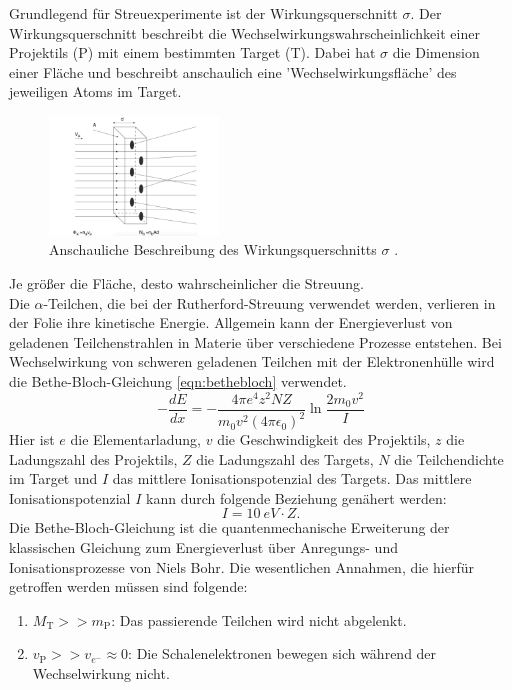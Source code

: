 Grundlegend für Streuexperimente ist der Wirkungsquerschnitt $\sigma$.
Der Wirkungsquerschnitt beschreibt die Wechselwirkungswahrscheinlichkeit einer Projektils (P) mit einem bestimmten Target (T).
Dabei hat $\sigma$ die Dimension einer Fläche und beschreibt anschaulich eine 'Wechselwirkungsfläche' des jeweiligen Atoms im Target.
\begin{figure}[h!]
  \centering
  \includegraphics[width=0.4\textwidth]{images/wq.pdf}
  \caption{Anschauliche Beschreibung des Wirkungsquerschnitts $\sigma$ \cite{povh}.}
  \label{fig:wq}
\end{figure}
Je größer die Fläche, desto wahrscheinlicher die Streuung.
%
\\Die $\alpha$-Teilchen, die bei der Rutherford-Streuung verwendet werden, verlieren in der Folie ihre kinetische Energie.
Allgemein kann der Energieverlust von geladenen Teilchenstrahlen in Materie über verschiedene Prozesse entstehen.
Bei Wechselwirkung von schweren geladenen Teilchen mit der Elektronenhülle wird die Bethe-Bloch-Gleichung \eqref{eqn:bethebloch} verwendet.
\begin{equation}
	- \frac{d E}{d x} = - \frac{4 \pi e^4 z^2 N Z}{m_0 v^2 (4 \pi \epsilon_0)^2} \ln{\frac{2 m_0 v^2}{I}}
	\label{eqn:bethebloch}
\end{equation}
Hier ist $e$ die Elementarladung, $v$ die Geschwindigkeit des Projektils, $z$ die Ladungszahl des Projektils, $Z$ die Ladungszahl des Targets, $N$ die Teilchendichte im Target und $I$ das mittlere Ionisationspotenzial des Targets.
Das mittlere Ionisationspotenzial $I$ kann durch folgende Beziehung genähert werden:
\begin{equation*}
	I= \SI{10}{eV} \cdot Z.
\end{equation*}
Die Bethe-Bloch-Gleichung ist die quantenmechanische Erweiterung der klassischen Gleichung zum Energieverlust über Anregungs- und Ionisationsprozesse von Niels Bohr.
Die wesentlichen Annahmen, die hierfür getroffen werden müssen sind folgende:
\begin{enumerate}
	\item $M_{\text{T}} >> m_{\text{P}}$: Das passierende Teilchen wird nicht abgelenkt.
	\item $v_{\text{P}} >> v_{e^-} \approx 0$: Die Schalenelektronen bewegen sich während der Wechselwirkung nicht.
\end{enumerate}
